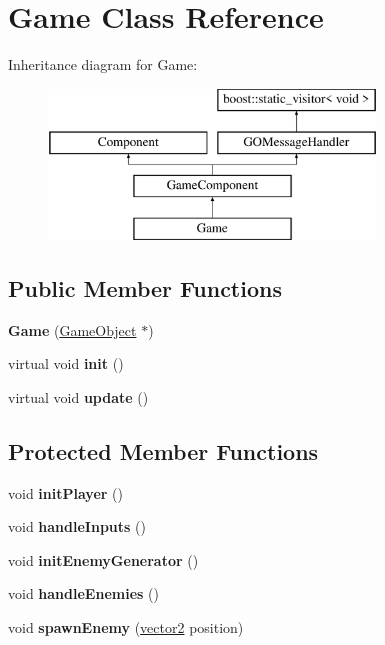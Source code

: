 \hypertarget{class_game}{}\section{Game Class Reference}
\label{class_game}
Inheritance diagram for Game\+:\begin{figure}[H]
\begin{center}
\leavevmode
\includegraphics[height=4.000000cm]{class_game}
\end{center}
\end{figure}
\subsection*{Public Member Functions}
\begin{DoxyCompactItemize}
\item 
\hypertarget{class_game_a366e0d372a100b7de351caf14cede996}{}\label{class_game_a366e0d372a100b7de351caf14cede996} 
{\bfseries Game} (\hyperlink{class_game_object}{Game\+Object} $\ast$)
\item 
\hypertarget{class_game_a6f3a33940524b6ba9d83f627ccb14bbf}{}\label{class_game_a6f3a33940524b6ba9d83f627ccb14bbf} 
virtual void {\bfseries init} ()
\item 
\hypertarget{class_game_a79df6376b332d63c9eca0dcee30305c3}{}\label{class_game_a79df6376b332d63c9eca0dcee30305c3} 
virtual void {\bfseries update} ()
\end{DoxyCompactItemize}
\subsection*{Protected Member Functions}
\begin{DoxyCompactItemize}
\item 
\hypertarget{class_game_a405c0bb8156590c93304f11cf1f08065}{}\label{class_game_a405c0bb8156590c93304f11cf1f08065} 
void {\bfseries init\+Player} ()
\item 
\hypertarget{class_game_ab6ac1ec04e03f55c0af1d4f9d0540cc7}{}\label{class_game_ab6ac1ec04e03f55c0af1d4f9d0540cc7} 
void {\bfseries handle\+Inputs} ()
\item 
\hypertarget{class_game_a8e042746fe9490afb380d6bddcfbe140}{}\label{class_game_a8e042746fe9490afb380d6bddcfbe140} 
void {\bfseries init\+Enemy\+Generator} ()
\item 
\hypertarget{class_game_a14753444a9131fdd5985443584b05b08}{}\label{class_game_a14753444a9131fdd5985443584b05b08} 
void {\bfseries handle\+Enemies} ()
\item 
\hypertarget{class_game_a2e05059d70edc32d1d37a9fc1c179b86}{}\label{class_game_a2e05059d70edc32d1d37a9fc1c179b86} 
void {\bfseries spawn\+Enemy} (\hyperlink{structvector2}{vector2} position)
\end{DoxyCompactItemize}
